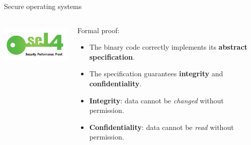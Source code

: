 \documentclass[xcolor={x11names}]{beamer}
\begin{document}
\begin{frame}{Secure operating systems}
    \begin{columns}
        \begin{column}{0.4\textwidth}
            \begin{center}
                \includegraphics[height=2cm]{logos/seL4-logo-text-white.png}
            \end{center}
        \end{column}
        \pause
        \begin{column}{0.6\textwidth}
            Formal proof\footnotemark:
            \begin{itemize}
                \item The binary code correctly implements its \textbf{abstract specification}.
                \item The specification guarantees \textbf{integrity} and \textbf{confidentiality}.
            \end{itemize}

            \bigskip
            \pause

            \begin{itemize}
                \item \textbf{Integrity}: data cannot be \textit{changed} without permission.
                \item \textbf{Confidentiality}: data cannot be \textit{read} without permission.
            \end{itemize}
        \end{column}
    \end{columns}
\end{frame}
\end{document}
